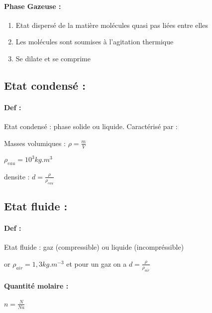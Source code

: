 \documentclass[a4paper,10pt]{report}
\begin{document}
\paragraph{Phase Gazeuse :}
\begin{enumerate}
\item Etat dispersé de la matière molécules quasi pas liées entre elles
\item Les molécules sont soumises à l'agitation thermique
\item Se dilate et se comprime
\end{enumerate}

\subsection{Etat condensé :}
\paragraph{Def :}
Etat condensé : phase solide ou liquide. Caractérisé par :

Masses volumiques :
\begin{math}
 \rho = \frac{m}{V}
\end{math}

\begin{math}
 \rho_{eau}= 10^3 kg.m^3
\end{math}

densite :
\begin{math}
 d = \frac{\rho}{\rho_{eau}}
\end{math}

\subsection{Etat fluide :}
\paragraph{Def : }Etat fluide : gaz (compressible) ou liquide (incompréssible)

or 
\begin{math}
 \rho_{air}=1,3 kg.m^{-3}
\end{math}
 et pour un gaz on a 
 \begin{math}
  d=\frac{\rho}{\rho_{air}}
 \end{math}

 \paragraph{Quantité molaire :}
 \begin{math}
  n=\frac{N}{Na}
 \end{math}
\end{document}
